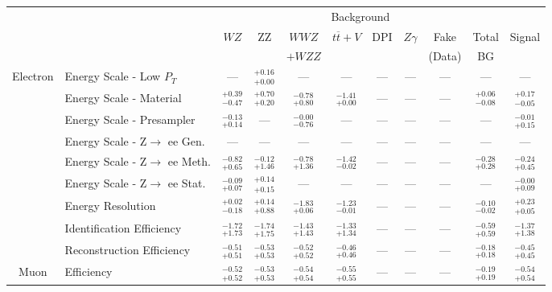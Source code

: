\small
\renewcommand{\tabcolsep}{1pt}
\begin{tabular}{|cl||ccccccc|c||c|}
\hline
 & & \multicolumn{8}{c||}{Background} & \\ 
 & & $WZ$ & ZZ & $WWZ$ & $t\overline{t}+V$ & DPI & $Z\gamma$ & Fake & Total & Signal\\ 
 & & &  & $+WZZ$ &  &  &  & (Data) & BG & \\ 
\hline\hline
\multirow{9}{*}{Electron}
&Energy Scale - Low $P_{T}$ & --- &  $^{+0.16}_{+0.00}$  & --- & --- & --- & --- & --- & --- & ---\\ 
\cline{2-11}
&Energy Scale - Material &  $^{+0.39}_{-0.47}$  &  $^{+0.70}_{+0.20}$  &  $^{-0.78}_{+0.80}$  &  $^{-1.41}_{+0.00}$  & --- & --- & --- &  $^{+0.06}_{-0.08}$  &  $^{+0.17}_{-0.05}$ \\ 
\cline{2-11}
&Energy Scale - Presampler &  $^{-0.13}_{+0.14}$  & --- &  $^{-0.00}_{-0.76}$  & --- & --- & --- & --- & --- &  $^{-0.01}_{+0.15}$ \\ 
\cline{2-11}
&Energy Scale - Z$\rightarrow$ ee Gen. & --- & --- & --- & --- & --- & --- & --- & --- & ---\\ 
\cline{2-11}
&Energy Scale - Z$\rightarrow$ ee Meth. &  $^{-0.82}_{+0.65}$  &  $^{-0.12}_{+1.46}$  &  $^{-0.78}_{+1.36}$  &  $^{-1.42}_{-0.02}$  & --- & --- & --- &  $^{-0.28}_{+0.28}$  &  $^{-0.24}_{+0.45}$ \\ 
\cline{2-11}
&Energy Scale - Z$\rightarrow$ ee Stat. &  $^{-0.09}_{+0.07}$  &  $^{+0.14}_{+0.15}$  & --- & --- & --- & --- & --- & --- &  $^{-0.00}_{+0.09}$ \\ 
\cline{2-11}
&Energy Resolution &  $^{+0.02}_{-0.18}$  &  $^{+0.14}_{+0.88}$  &  $^{-1.83}_{+0.06}$  &  $^{-1.23}_{-0.01}$  & --- & --- & --- &  $^{-0.10}_{-0.02}$  &  $^{+0.23}_{+0.05}$ \\ 
\cline{2-11}
&Identification Efficiency &  $^{-1.72}_{+1.73}$  &  $^{-1.74}_{+1.75}$  &  $^{-1.43}_{+1.43}$  &  $^{-1.33}_{+1.34}$  & --- & --- & --- &  $^{-0.59}_{+0.59}$  &  $^{-1.37}_{+1.38}$ \\ 
\cline{2-11}
&Reconstruction Efficiency &  $^{-0.51}_{+0.51}$  &  $^{-0.53}_{+0.53}$  &  $^{-0.52}_{+0.52}$  &  $^{-0.46}_{+0.46}$  & --- & --- & --- &  $^{-0.18}_{+0.18}$  &  $^{-0.45}_{+0.45}$ \\ 
\hline
\multirow{4}{*}{Muon}
&Efficiency &  $^{-0.52}_{+0.52}$  &  $^{-0.53}_{+0.53}$  &  $^{-0.54}_{+0.54}$  &  $^{-0.55}_{+0.55}$  & --- & --- & --- &  $^{-0.19}_{+0.19}$  &  $^{-0.54}_{+0.54}$ \\ 

\end{tabular}
